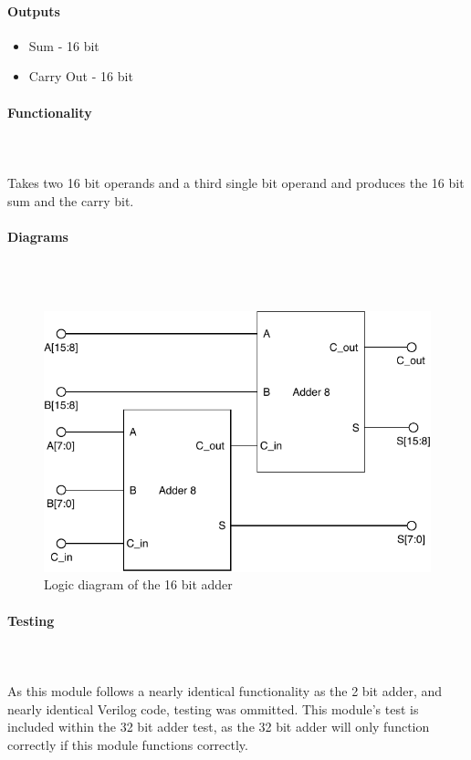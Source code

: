 \documentclass{article}
\begin{document}
    \paragraph{Outputs}
    \begin{itemize}
        \item Sum - 16 bit
        \item Carry Out - 16 bit
    \end{itemize}

    \paragraph{Functionality}
    \hfill\\\\
    Takes two 16 bit operands and a third single bit operand and produces the
    16 bit sum and the carry bit.

    \paragraph{Diagrams}
    \hfill\\\\
    \begin{figure}[H]
        \centering
        \includegraphics{../diagrams/alu/adder/adder_16.pdf}
        \caption{Logic diagram of the 16 bit adder}
    \end{figure}

    \paragraph{Testing}
    \hfill\\\\
    As this module follows a nearly identical functionality as the 2
    bit adder, and nearly identical Verilog code, testing was ommitted.
    This module's test is included within the 32 bit adder test, as the
    32 bit adder will only function correctly if this module functions
    correctly.
\end{document}
